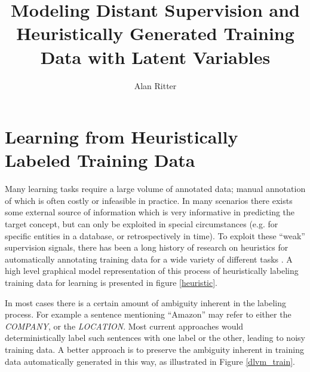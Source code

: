 \documentclass[12pt]{article}
\begin{document}
\date{}
\title{Modeling Distant Supervision and Heuristically Generated Training Data with Latent Variables}
\author{Alan Ritter}
\maketitle



\section{Learning from Heuristically Labeled Training Data}
Many learning tasks require a large volume of annotated data; manual annotation of which is often costly or infeasible in practice.
In many scenarios there exists some external source of information which is very informative in predicting the target concept, but
can only be exploited in special circumstances (e.g. for specific entities in a database, or retrospectively in time).
To exploit these ``weak'' supervision signals, there has been a long history of research on heuristics for automatically annotating training data
for a wide variety of different tasks \citep{Agichtein01,Carlson10,Weld09,mintz09}.
A high level graphical model representation of this process of heuristically labeling training data for learning is presented in figure \ref{heuristic}.

In most cases there is a certain amount of ambiguity inherent in the labeling process.  For example a sentence mentioning ``Amazon''
may refer to either the {\sl COMPANY}, or the {\sl LOCATION}.  Most current approaches would deterministically label such
sentences with one label or the other, leading to noisy training data.
A better approach is to preserve the ambiguity inherent in training data automatically generated in this way, as illustrated
in Figure \ref{dlvm_train}.
\end{document}
